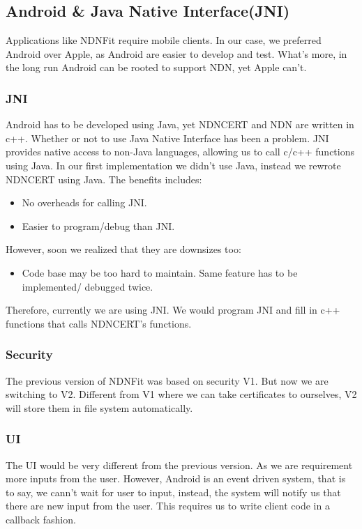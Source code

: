 \documentclass[a0,portrait]{poster}
\begin{document}
\begin{multicols}{2}
\subsection*{Android \& Java Native Interface(JNI)}
\par 
	Applications like NDNFit require mobile clients. 
	In our case, we preferred Android over Apple, as Android are easier to develop and test.
	What's more, in the long run Android can be rooted to support NDN, yet Apple can't.
\subsubsection*{JNI}
	Android has to be developed using Java, yet NDNCERT and NDN are written in c++. Whether or not to use Java Native Interface has been a problem. JNI provides native access to non-Java languages, allowing us to call c/c++ functions using Java. In our first implementation we didn't use Java, instead we rewrote NDNCERT using Java. The benefits includes:
	\begin{itemize}
		\item No overheads for calling JNI.
		\item Easier to program/debug than JNI.
	\end{itemize}
\par
	However, soon we realized that they are downsizes too:
	\begin{itemize}
		\item Code base may be too hard to maintain. Same feature has to be implemented/ debugged twice.
	\end{itemize}
\par
	Therefore, currently we are using JNI. We would program JNI and fill in c++ functions that calls NDNCERT's functions.
\subsubsection*{Security}
\par
	The previous version of NDNFit was based on security V1. 
	But now we are switching to V2. 
	Different from V1 where we can take certificates to ourselves, V2 will store them in file system automatically. 
\subsubsection*{UI}
\par
	The UI would be very different from the previous version. 
	As we are requirement more inputs from the user.
	However, Android is an event driven system, that is to say, we cann't wait for user to input, instead, the system will notify us that there are new input from the user. 
	This requires us to write client code in a callback fashion.


\end{multicols}
\end{document}
